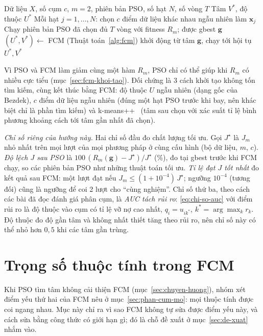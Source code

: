 \begin{algorithm}[htbp]
\caption{PSO tìm tâm khởi tạo cho FCM (\texttt{pso\_khoi\_tao.py})}
\label{alg:pso-khoi-tao}
\begin{algorithmic}[1]
\REQUIRE Dữ liệu $X$, số cụm $c$, $m = 2$, phiên bản PSO, số hạt $N$, số vòng $T$
\ENSURE Tâm $V^{*}$, độ thuộc $U^{*}$
\STATE Mỗi hạt $j = 1, \dots, N$: chọn $c$ điểm dữ liệu khác nhau ngẫu nhiên làm $\mathbf{x}_j$
\STATE Chạy phiên bản PSO đã chọn đủ $T$ vòng với fitness $R_m$; được gbest $\mathbf{g}$
\STATE $(U^{*}, V^{*}) \leftarrow$ FCM (Thuật toán~\ref{alg:fcm}) khởi động từ tâm $\mathbf{g}$, chạy tới hội tụ
\RETURN $U^{*}, V^{*}$
\end{algorithmic}
\end{algorithm}

Vì PSO và FCM làm giảm cùng một hàm $R_m$, PSO chỉ có thể giúp khi $R_m$ có nhiều cực tiểu (mục~\ref{sec:fcm-khoi-tao}).
Đối chứng là 3 cách khởi tạo không tốn tìm kiếm, cùng kết thúc bằng FCM: độ thuộc $U$ ngẫu nhiên (dạng gốc của Bezdek),
$c$ điểm dữ liệu ngẫu nhiên (đúng một hạt PSO trước khi bay, nên khác biệt chỉ là phần tìm kiếm) và
k-means++~\cite{arthur2007kmeanspp} (tâm sau chọn với xác suất tỉ lệ bình phương khoảng cách tới tâm gần nhất đã chọn).

\emph{Chỉ số riêng của hướng này.} Hai chỉ số đầu đo chất lượng tối ưu. Gọi $J^{\star}$ là $J_m$ nhỏ nhất trên mọi lượt của mọi phương pháp
ở cùng cấu hình (bộ dữ liệu, $m$, $c$). \emph{Độ lệch $J$ sau PSO} là $100\,(R_m(\mathbf{g}) - J^{\star}) / J^{\star}$ (\%), đo
tại gbest trước khi FCM chạy, so các phiên bản PSO như những thuật toán tối ưu. \emph{Tỉ lệ đạt $J$ tốt nhất} đo kết quả sau
FCM: một lượt đạt nếu $J_m \le (1 + 10^{-4})\,J^{\star}$; ngưỡng $10^{-4}$ (tương đối) cũng là ngưỡng để coi 2 lượt cho
``cùng nghiệm''. Chỉ số thứ ba, theo cách các bài đã đọc đánh giá phân cụm, là \emph{AUC tách rủi ro}: \eqref{eq:chi-so-auc} với điểm rủi ro là độ thuộc vào
cụm có tỉ lệ vỡ nợ cao nhất, $q_i = u_{ik^{*}}$, $k^{*} = \arg\max_k r_k$. Độ thuộc đo độ gần tâm và không nhất thiết tăng
theo rủi ro, nên chỉ số này có thể nhỏ hơn $0{,}5$ khi các tâm gần trùng.
\label{sec:chi-so-tam}

\section{Trọng số thuộc tính trong FCM}
\label{sec:trong-so-fcm}

Khi PSO tìm tâm không cải thiện FCM (mục~\ref{sec:chuyen-huong}), nhóm xét điểm yếu thứ hai của FCM nêu ở
mục~\ref{sec:phan-cum-mo}: mọi thuộc tính được coi ngang nhau. Mục này chỉ ra vì sao FCM không tự sửa được điểm yếu này, và
cách sửa bằng công thức có giới hạn gì; đó là chỗ đề xuất ở mục~\ref{sec:de-xuat} nhắm vào.


